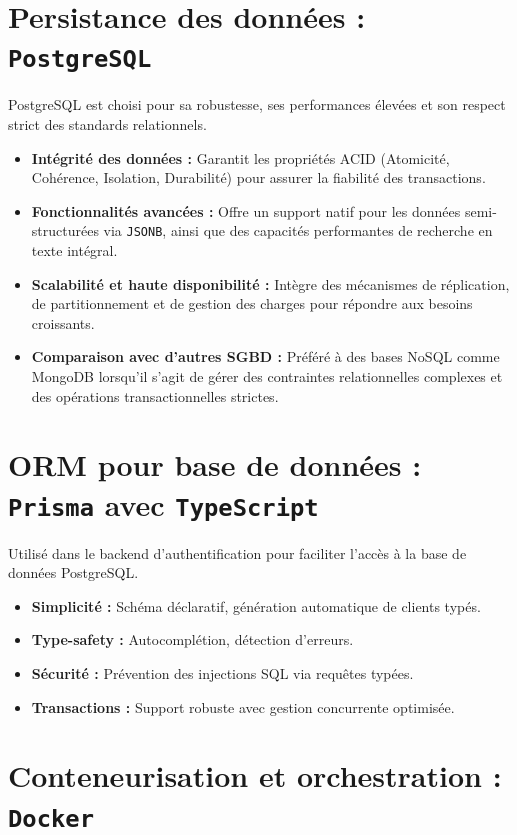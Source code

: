 \documentclass{rapportPfe}
\begin{document}
\section{Persistance des données : \texttt{PostgreSQL}}

PostgreSQL est choisi pour sa robustesse, ses performances élevées et son respect strict des standards relationnels.

\begin{itemize}
    \item \textbf{Intégrité des données :} Garantit les propriétés ACID (Atomicité, Cohérence, Isolation, Durabilité) pour assurer la fiabilité des transactions.
    \item \textbf{Fonctionnalités avancées :} Offre un support natif pour les données semi-structurées via \texttt{JSONB}, ainsi que des capacités performantes de recherche en texte intégral.
    \item \textbf{Scalabilité et haute disponibilité :} Intègre des mécanismes de réplication, de partitionnement et de gestion des charges pour répondre aux besoins croissants.
    \item \textbf{Comparaison avec d’autres SGBD :} Préféré à des bases NoSQL comme MongoDB lorsqu’il s’agit de gérer des contraintes relationnelles complexes et des opérations transactionnelles strictes.
\end{itemize}

\section{ORM pour base de données : \texttt{Prisma} avec \texttt{TypeScript}}

Utilisé dans le backend d’authentification pour faciliter l’accès à la base de données PostgreSQL.

\begin{itemize}
    \item \textbf{Simplicité :} Schéma déclaratif, génération automatique de clients typés.
    \item \textbf{Type-safety :} Autocomplétion, détection d’erreurs.
    \item \textbf{Sécurité :} Prévention des injections SQL via requêtes typées.
    \item \textbf{Transactions :} Support robuste avec gestion concurrente optimisée.
\end{itemize}

\section{Conteneurisation et orchestration : \texttt{Docker}}
\end{document}
